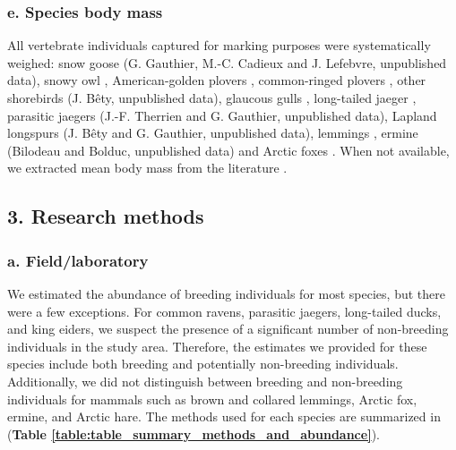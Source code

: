 \documentclass[a4paper,twoside,12pt]{article}
\begin{document}
\subsubsection*{e. Species body mass}
All vertebrate individuals captured for marking purposes were systematically weighed: snow goose (G. Gauthier, M.-C. Cadieux and J. Lefebvre, unpublished data), snowy owl \citep{therrien2012, robillard2018}, American-golden plovers \citep{lamarre2021}, common-ringed plovers \citep{leandri2019}, other shorebirds (J. Bêty, unpublished data), glaucous gulls \citep{gauthier2015}, long-tailed jaeger \citep{seyer2019}, parasitic jaegers (J.-F. Therrien and G. Gauthier, unpublished data), Lapland longspurs (J. Bêty and G. Gauthier, unpublished data), lemmings \citep{gauthier2020lemmings}, ermine (Bilodeau and Bolduc, unpublished data) and Arctic foxes \citep{lai2015}. When not available, we extracted mean body mass from the literature \citep{wilman2014}.
\newpage
                        
    \subsection*{3.  Research methods}
                \subsubsection*{a. Field/laboratory}
We estimated the abundance of breeding individuals for most species, but there were a few exceptions. For common ravens, parasitic jaegers, long-tailed ducks, and king eiders, we suspect the presence of a significant number of non-breeding individuals in the study area. Therefore, the estimates we provided for these species include both breeding and potentially non-breeding individuals. Additionally, we did not distinguish between breeding and non-breeding individuals for mammals such as brown and collared lemmings, Arctic fox, ermine, and Arctic hare. The methods used for each species are summarized in (\textbf{Table \ref{table:table_summary_methods_and_abundance}}).
\end{document}
